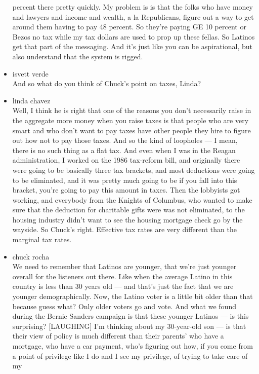 \begin{itemize}
  percent there pretty quickly. My problem is is that the folks who have
  money and lawyers and income and wealth, a la Republicans, figure out
  a way to get around them having to pay 48 percent. So they're paying
  GE 10 percent or Bezos no tax while my tax dollars are used to prop up
  these fellas. So Latinos get that part of the messaging. And it's just
  like you can be aspirational, but also understand that the system is
  rigged.
\item
  isvett verde\\
  And so what do you think of Chuck's point on taxes, Linda?
\item
  linda chavez\\
  Well, I think he is right that one of the reasons you don't
  necessarily raise in the aggregate more money when you raise taxes is
  that people who are very smart and who don't want to pay taxes have
  other people they hire to figure out how not to pay those taxes. And
  so the kind of loopholes --- I mean, there is no such thing as a flat
  tax. And even when I was in the Reagan administration, I worked on the
  1986 tax-reform bill, and originally there were going to be basically
  three tax brackets, and most deductions were going to be eliminated,
  and it was pretty much going to be if you fall into this bracket,
  you're going to pay this amount in taxes. Then the lobbyists got
  working, and everybody from the Knights of Columbus, who wanted to
  make sure that the deduction for charitable gifts were was not
  eliminated, to the housing industry didn't want to see the housing
  mortgage check go by the wayside. So Chuck's right. Effective tax
  rates are very different than the marginal tax rates.
\item
  chuck rocha\\
  We need to remember that Latinos are younger, that we're just younger
  overall for the listeners out there. Like when the average Latino in
  this country is less than 30 years old --- and that's just the fact
  that we are younger demographically. Now, the Latino voter is a little
  bit older than that because guess what? Only older voters go and vote.
  And what we found during the Bernie Sanders campaign is that these
  younger Latinos --- is this surprising? {[}LAUGHING{]} I'm thinking
  about my 30-year-old son --- is that their view of policy is much
  different than their parents' who have a mortgage, who have a car
  payment, who's figuring out how, if you come from a point of privilege
  like I do and I see my privilege, of trying to take care of my

\end{itemize}

